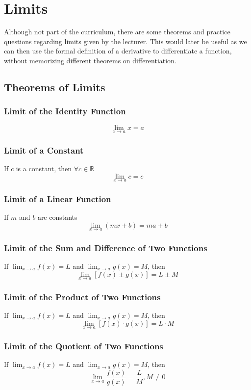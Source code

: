 \documentclass[hidelinks, a4paper, 12pt]{article}
\begin{document}
    \section{Limits}
        Although not part of the curriculum, there are some theorems and practice questions regarding limits given by the lecturer. This would later be useful 
        as we can then use the formal definition of a derivative to differentiate a function, without memorizing different theorems on differentiation.
        \subsection{Theorems of Limits}
            \subsubsection{Limit of the Identity Function}
                \[\lim_{x\to a} x = a\]

            \subsubsection{Limit of a Constant}
                If $c$ is a constant, then $\forall c \in \mathbb{R}$
                \[\lim_{x\to a} c = c\]

            \subsubsection{Limit of a Linear Function}
                If $m$ and $b$ are constants
                \[\lim_{x\to a} (mx+b) = ma + b\]

            \subsubsection{Limit of the Sum and Difference of Two Functions}
                If $\lim_{x\to a}f(x) = L$ and $\lim_{x\to a}g(x) = M$, then
                \[\lim_{x\to a} [f(x)\pm g(x)] = L \pm M\]

            \subsubsection{Limit of the Product of Two Functions}
                If $\lim_{x\to a}f(x) = L$ and $\lim_{x\to a}g(x) = M$, then
                \[\lim_{x\to a} [f(x)\cdot g(x)] = L \cdot M\]

            \subsubsection{Limit of the Quotient of Two Functions}
                If $\lim_{x\to a}f(x) = L$ and $\lim_{x\to a}g(x) = M$, then
                \[\lim_{x\to a} \frac{f(x)}{g(x)} = \frac{L}{M}, M \neq 0\]
\end{document}
